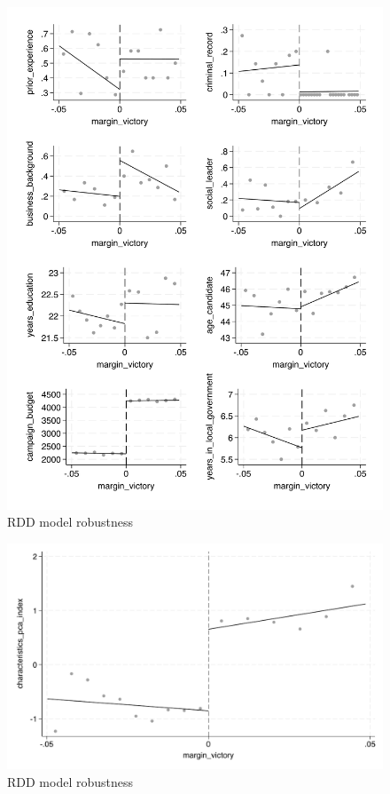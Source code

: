\documentclass{article}
\begin{document}
\subsection{}

\begin{figure}
    \centering
    \includegraphics[scale=0.5]{../outputs/characteristics_binned_scatter_esmv_linear_plot.pdf}
    \caption{RDD model robustness}
    \label{fig:characteristics}
\end{figure}

\begin{figure}[H]
    \centering
    \includegraphics[scale=0.5]{../outputs/characteristics_pca_index_binned_scatter_esmv_linear_plot.pdf}
    \caption{RDD model robustness}
    \label{fig:pca_index}
\end{figure}
\end{document}
